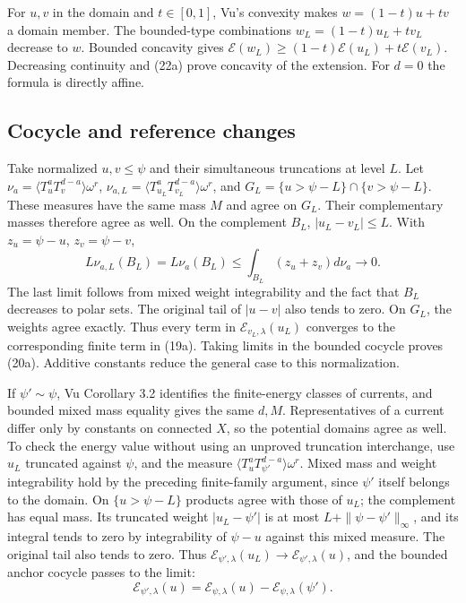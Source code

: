 \documentclass[
  11pt,
]{article}
\begin{document}
For \(u,v\) in the domain and \(t\in[0,1]\), Vu's convexity makes
\(w=(1-t)u+tv\) a domain member. The bounded-type combinations
\(w_L=(1-t)u_L+tv_L\) decrease to \(w\). Bounded concavity gives
\(\mathcal E(w_L)\geq(1-t)\mathcal E(u_L)+t\mathcal E(v_L)\). Decreasing
continuity and (22a) prove concavity of the extension. For \(d=0\) the
formula is directly affine.

\subsection{Cocycle and reference
changes}\label{cocycle-and-reference-changes}

Take normalized \(u,v\leq\psi\) and their simultaneous truncations at
level \(L\). Let \(\nu_a=\langle T_u^aT_v^{d-a}\rangle\omega^r\),
\(\nu_{a,L}=\langle T_{u_L}^aT_{v_L}^{d-a}\rangle\omega^r\), and
\(G_L=\{u>\psi-L\}\cap\{v>\psi-L\}\). These measures have the same mass
\(M\) and agree on \(G_L\). Their complementary masses therefore agree
as well. On the complement \(B_L\), \(|u_L-v_L|\leq L\). With
\(z_u=\psi-u\), \(z_v=\psi-v\), \[
L\nu_{a,L}(B_L)=L\nu_a(B_L)
\leq\int_{B_L}(z_u+z_v)d\nu_a\longrightarrow0.
\] The last limit follows from mixed weight integrability and the fact
that \(B_L\) decreases to polar sets. The original tail of \(|u-v|\)
also tends to zero. On \(G_L\), the weights agree exactly. Thus every
term in \(\mathcal E_{v_L,\lambda}(u_L)\) converges to the corresponding
finite term in (19a). Taking limits in the bounded cocycle proves (20a).
Additive constants reduce the general case to this normalization.

If \(\psi'\sim\psi\), Vu Corollary 3.2 identifies the finite-energy
classes of currents, and bounded mixed mass equality gives the same
\(d,M\). Representatives of a current differ only by constants on
connected \(X\), so the potential domains agree as well. To check the
energy value without using an unproved truncation interchange, use
\(u_L\) truncated against \(\psi\), and the measure
\(\langle T_u^aT_{\psi'}^{d-a}\rangle\omega^r\). Mixed mass and weight
integrability hold by the preceding finite-family argument, since
\(\psi'\) itself belongs to the domain. On \(\{u>\psi-L\}\) products
agree with those of \(u_L\); the complement has equal mass. Its
truncated weight \(|u_L-\psi'|\) is at most \(L+\|\psi-\psi'\|_\infty\),
and its integral tends to zero by integrability of \(\psi-u\) against
this mixed measure. The original tail also tends to zero. Thus
\(\mathcal E_{\psi',\lambda}(u_L)\to\mathcal E_{\psi',\lambda}(u)\), and
the bounded anchor cocycle passes to the limit: \[
\mathcal E_{\psi',\lambda}(u)=\mathcal E_{\psi,\lambda}(u)-\mathcal E_{\psi,\lambda}(\psi').
\]
\end{document}
